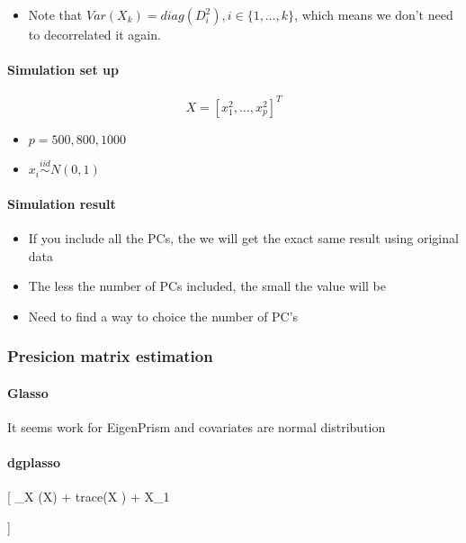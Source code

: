 \documentclass[]{article}
\providecommand{\tightlist}{%
  \setlength{\itemsep}{0pt}\setlength{\parskip}{0pt}}
\let\oldparagraph\paragraph
\renewcommand{\paragraph}[1]{\oldparagraph{#1}\mbox{}}
\begin{document}
\begin{itemize}
\tightlist
\item
  Note that \(Var(X_k) = diag(D_i^2), i \in \{1, \dots, k\}\), which
  means we don't need to decorrelated it again.
\end{itemize}

\paragraph{Simulation set up}\label{simulation-set-up}

\[
X = [x_1^2, \dots, x_p^2]^T
\]

\begin{itemize}
\tightlist
\item
  \(p = 500,800,1000\)\\
\item
  \(x_i \stackrel{iid}{\sim} N(0,1)\)
\end{itemize}

\paragraph{Simulation result}\label{simulation-result}

\begin{itemize}
\tightlist
\item
  If you include all the PCs, the we will get the exact same result
  using original data\\
\item
  The less the number of PCs included, the small the value will be\\
\item
  Need to find a way to choice the number of PC's
\end{itemize}

\subsubsection{Presicion matrix
estimation}\label{presicion-matrix-estimation}

\paragraph{Glasso}\label{glasso}

It seems work for EigenPrism and covariates are normal distribution

\paragraph{dgplasso}\label{dgplasso}

{[} \min\_X \log \det (X) + trace(X \Sigma) +
\rho \textbar{}X\textbar{}\_1

{]}

\paragraph{}\label{section}
\end{document}
